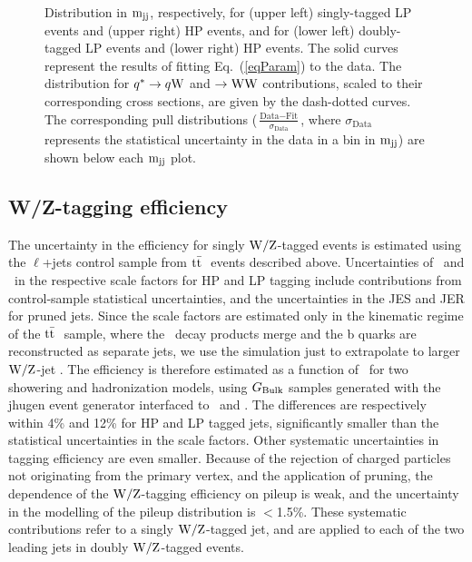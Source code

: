 \begin{figure}[th!b]
 \caption{
   Distribution in ${\rm m_{jj} }$, respectively, for
   (upper left) singly-tagged LP events and (upper right) HP events, and for (lower left) doubly-tagged
   LP events and (lower right) HP events. The solid curves represent the
   results of fitting Eq.~(\ref{eqParam}) to the data. The
   distribution for $q^*\to q {\rm W}$ and \GRS $\to{\rm W}{\rm W}$
   contributions, scaled to their corresponding cross sections, are
   given by the dash-dotted curves. The corresponding pull
   distributions
   ($\frac{\text{Data}-\text{Fit}}{\sigma_{\text{Data}}}$, where
   $\sigma_{\text{Data}}$ represents the statistical uncertainty in
   the data in a bin in ${\rm m_{jj} }$) are shown below each
   ${\rm m_{jj}}$ plot.}
\label{fig:BG}
\end{figure}


\subsection{W/Z-tagging efficiency}
\label{sec:vtageff}

The uncertainty in the efficiency for singly ${\rm W}/{\rm Z}$-tagged events
is estimated using the $\ell$+jets control sample from $\mathrm{t}\bar{\mathrm{t}}~$ events
described above. Uncertainties of \scalefactorHPu~and
\scalefactorLPu~in the respective scale factors for HP and LP tagging
include contributions from control-sample statistical uncertainties,
and the uncertainties in the JES and JER for pruned jets. Since the
scale factors are estimated only in the kinematic regime of the
$\mathrm{t}\bar{\mathrm{t}}~$ sample, where the \PW\ decay products merge and the b
quarks are reconstructed as separate jets, we use the simulation just
to extrapolate to larger ${\rm W}/{\rm Z}$-jet \pt. The efficiency is
therefore estimated as a function of \pt~for two showering and
hadronization models, using $G_\mathrm{Bulk}$ samples generated with the {\sc
  jhugen} event generator interfaced to \PYTHIA~and \HERWIG{++}. The
differences are respectively within 4\% and 12\% for HP and LP
tagged jets, significantly smaller than the statistical uncertainties
in the scale factors. Other systematic uncertainties in tagging
efficiency are even smaller. Because of the rejection of charged
particles not originating from the primary vertex, and the application
of pruning, the dependence of the ${\rm W}/{\rm Z}$-tagging efficiency on
pileup is weak, and the uncertainty in the modelling of the pileup
distribution is $<$1.5\%. These systematic contributions refer to a
singly ${\rm W}/{\rm Z}$-tagged jet, and are applied to each of the two
leading jets in doubly ${\rm W}/{\rm Z}$-tagged events.

